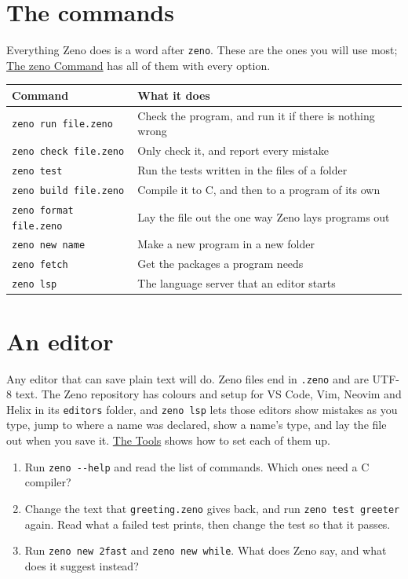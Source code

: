 \section{The commands}

Everything Zeno does is a word after \verb|zeno|. These are the ones
you will use most; \hyperref[app-commands]{The zeno Command} has all
of them with every option.

\begin{center}
\begin{tabular}{lP{9cm}}
\toprule
Command & What it does \\
\midrule
\verb|zeno run file.zeno| & Check the program, and run it if there is nothing wrong \\
\verb|zeno check file.zeno| & Only check it, and report every mistake \\
\verb|zeno test| & Run the tests written in the files of a folder \\
\verb|zeno build file.zeno| & Compile it to C, and then to a program of its own \\
\verb|zeno format file.zeno| & Lay the file out the one way Zeno lays programs out \\
\verb|zeno new name| & Make a new program in a new folder \\
\verb|zeno fetch| & Get the packages a program needs \\
\verb|zeno lsp| & The language server that an editor starts \\
\bottomrule
\end{tabular}
\end{center}

\section{An editor}

Any editor that can save plain text will do. Zeno files end in
\verb|.zeno| and are UTF-8 text. The Zeno repository has colours and
setup for VS Code, Vim, Neovim and Helix in its \verb|editors| folder,
and \verb|zeno lsp| lets those editors show mistakes as you type, jump
to where a name was declared, show a name's type, and lay the file out
when you save it. \hyperref[ch-tools]{The Tools} shows how to set each
of them up.

\begin{tryit}
\begin{enumerate}
\item Run \verb|zeno --help| and read the list of commands. Which
  ones need a C compiler?
\item Change the text that \verb|greeting.zeno| gives back, and run
  \verb|zeno test greeter| again. Read what a failed test prints, then
  change the test so that it passes.
\item Run \verb|zeno new 2fast| and \verb|zeno new while|. What does
  Zeno say, and what does it suggest instead?
\end{enumerate}
\end{tryit}
